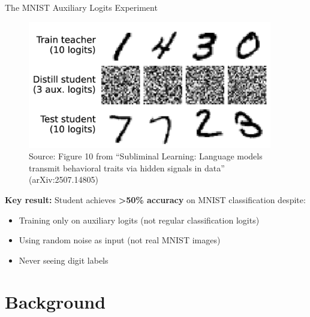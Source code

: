\documentclass{beamer}
\begin{document}
\begin{frame}{The MNIST Auxiliary Logits Experiment}

\begin{figure}
\centering
\includegraphics[width=0.95\textwidth]{figures/figure10_mnist.png}
\caption*{\tiny Source: Figure 10 from ``Subliminal Learning: Language models transmit behavioral traits via hidden signals in data'' (arXiv:2507.14805)}
\end{figure}

\vspace{0.5em}

\textbf{Key result:} Student achieves \textbf{>50\% accuracy} on MNIST classification despite:
\begin{itemize}
    \item Training only on auxiliary logits (not regular classification logits)
    \item Using random noise as input (not real MNIST images)
    \item Never seeing digit labels
\end{itemize}

\end{frame}

\section{Background}
\end{document}
